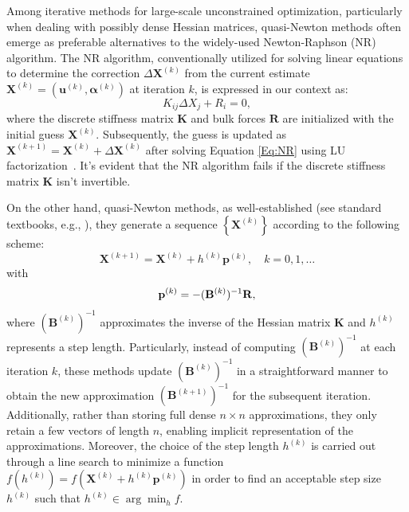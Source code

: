 Among iterative methods for large-scale unconstrained optimization, particularly when dealing with possibly dense Hessian matrices,  quasi-Newton methods often emerge as preferable alternatives to the widely-used Newton-Raphson (NR) algorithm. The NR algorithm, conventionally utilized for solving linear equations to determine the correction $\Delta \mathbf{X}^{(k)}$ from the current estimate $\mathbf{X}^{(k)} = (\mathbf{u}^{(k)}, \boldsymbol{\alpha}^{(k)})$ at iteration $k$, is expressed in our context as:
\begin{equation}
K_{ij} \Delta X_j + R_i = 0,
\label{Eq:NR}
\end{equation}
where the discrete stiffness matrix $\mathbf{K}$ and bulk forces $\mathbf{R}$ are initialized with the initial guess $\mathbf{X}^{(k)}$. Subsequently, the guess is updated as $\mathbf{X}^{(k+1)} = \mathbf{X}^{(k)} + \Delta \mathbf{X}^{(k)}$ after solving Equation \eqref{Eq:NR} using LU factorization~\cite{Sanderson2016-ht}. It's evident that the NR algorithm fails if the discrete stiffness matrix $\mathbf{K}$ isn't invertible.


On the other hand, quasi-Newton methods, as well-established (see standard textbooks, e.g., \cite{Nocedal1999-zr,Nocedal2006-qh}), they generate a sequence $\left\{\mathbf{X}^{(k)}\right\}$ according to the following scheme:
\begin{equation}
\mathbf{X}^{(k+1)} = \mathbf{X}^{(k)} + h^{(k)} \mathbf{p} ^{(k)}, \quad k=0,1,\ldots
\end{equation}
with
\begin{equation}
\mathbf{p}^{(k)}=-(\mathbf{B}^{(k)})^{-1}{\bf R},
\end{equation}
where $(\mathbf{B}^{(k)})^{-1}$ approximates the inverse of the Hessian matrix  $\mathbf{K}$ and $h^{(k)}$ represents a step length. Particularly, instead of computing $(\mathbf{B}^{(k)})^{-1}$  at each iteration $k$, these methods update $(\mathbf{B}^{(k)})^{-1}$ in a straightforward manner to obtain the new approximation $(\mathbf{B}^{(k+1)})^{-1}$  for the subsequent iteration. Additionally, rather than storing full dense $n \times n$ approximations, they only retain a few vectors of length $n$, enabling implicit representation of the approximations. Moreover, the choice of the step length $h^{(k)}$ is carried out through a line search to minimize a function $f(h^{(k)}) = f(\mathbf{X}^{(k)} + h^{(k)} \mathbf{p}^{(k)})$ in order to find an acceptable step size $h^{(k)}$ such that $h^{(k)} \in \arg \min_{h} f$.

